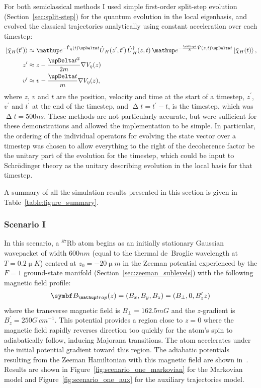 For both semiclassical methods I used simple first-order split-step evolution (Section~\ref{sec:split-step}) for the quantum evolution in the local eigenbasis, and evolved the classical trajectories analytically using constant acceleration over each timestep:
\begin{align}
\ket{\tilde\chi_H(t^\prime)} &\approx \ee^{-\hat\Gamma_\eta(t)\upDelta t}\hat U_H(z^\prime, t^\prime)\,\hat U_H^\dagger(z, t)\,\ee^{-\frac\ii\hbar \hat V(z, t)\upDelta t}\ket{\tilde\chi_H(t)},\\
z^\prime &\approx z - \frac{\upDelta t^2}{2m}\nabla V_\eta(z)\\
v^\prime &\approx v - \frac{\upDelta t}{m}\nabla V_\eta(z),
\end{align}
where $z$, $v$ and $t$ are the position, velocity and time at the start of a timestep, $z^\prime$, $v^\prime$ and $t^\prime$ at the end of the timestep, and $\upDelta t = t^\prime - t$, is the timestep, which was $\upDelta t = 500\unit{ns}$. These methods are not particularly accurate, but were sufficient for these demonstrations and allowed the implementation to be simple. In particular, the ordering of the individual operators for evolving the state vector over a timestep was chosen to allow everything to the right of the decoherence factor be the unitary part of the evolution for the timestep, which could be input to Schr\"odinger theory as the unitary describing evolution in the local basis for that timestep.

A summary of all the simulation results presented in this section is given in Table~\ref{table:figure_summary}.

\subsubsection{Scenario I}

In this scenario, a $^{87}$Rb atom begins as an initially stationary Gaussian wavepacket of width $600\unit{nm}$ (equal to the thermal de~Broglie wavelength at $T=0.2\unit{\upmu K}$) centred at $z_0 = -20\unit{\upmu m}$ in the Zeeman potential experienced by the $F=1$ ground-state manifold (Section~\ref{sec:zeeman_sublevels}) with the following magnetic field profile:
\begin{align}
\vec B_\up{trap}(z) = (B_x, B_y, B_z) = \left(B_\perp, 0, B_z^\prime z\right)
\end{align}
where the transverse magnetic field is $B_\perp = 162.5\unit{mG}$ and the $z$-gradient is $B_z^\prime = 250\unit{G\,cm^{-1}}$. This potential provides a region close to $z=0$ where the magnetic field rapidly reverses direction too quickly for the atom's spin to adiabatically follow, inducing Majorana transitions. The atom accelerates under the initial potential gradient toward this region. The adiabatic potentials resulting from the Zeeman Hamiltonian with this magnetic field are shown in~. Results are shown in Figure~\ref{fig:scenario_one_markovian} for the Markovian model and Figure~\ref{fig:scenario_one_aux} for the auxiliary trajectories model.


